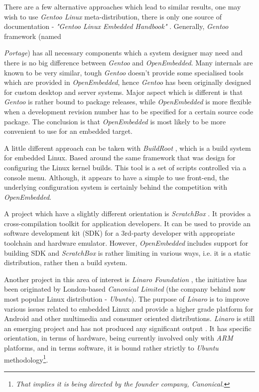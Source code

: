   There are a few alternative approaches which lead to similar results,
 one may wish to use \emph{Gentoo Linux} meta-distribution, there
 is only one source of documentation - \emph{"Gentoo Linux Embedded
 Handbook"} \cite{links:gentoo:embedded}. Generally, \emph{Gentoo}
 framework (named {\emph{Portage}) has all necessary components
 which a system designer may need and there is no big difference
 between \emph{Gentoo} and \emph{OpenEmbedded}. Many internals
 are known to be very similar, tough \emph{Gentoo} doesn't provide
 some specialised tools which are provided in \emph{OpenEmbedded},
 hence \emph{Gentoo} has been originally designed for custom
 desktop and server systems. Major aspect which is different is
 that \emph{Gentoo} is rather bound to package releases, while
 \emph{OpenEmbedded} is more flexible when a development revision
 number has to be specified for a certain source code package.
 The conclusion is that \emph{OpenEmbedded} is most likely to be
 more convenient to use for an embedded target.
 
  A little different approach can be taken with \emph{BuildRoot}
 \cite{links:buildroot:homepage}, which is a build system for
 embedded Linux. Based around the same framework that was design
 for configuring the Linux kernel builds. This tool is a set of
 scripts controlled via a console menu. Although, it appears to
 have a simple to use front-end, the underlying configuration
 system is certainly behind the competition with \emph{OpenEmbedded}.

  A project which have a slightly different orientation is
 \emph{ScratchBox} \cite{links:sbox:homepage}. It provides
 a cross-compilation toolkit for application developers.
 It can be used to provide an software development kit (SDK)
 for a 3rd-party developer with appropriate toolchain and
 hardware emulator. However, \emph{OpenEmbedded} includes
 support for building SDK and \emph{ScratchBox} is rather
 limiting in various ways, i.e. it is a static distribution,
 rather then a build system.
 
  Another project in this area of interest is \emph{Linaro Foundation}
 \cite{links:linaro:homepage}, the initiative has been originated by
 London-based \emph{Canonical Limited} (the company behind now most
 popular Linux distribution - \emph{Ubuntu}).
 The purpose of \emph{Linaro} is to improve various issues related to
 embedded Linux and provide a higher grade platform for Android and
 other multimedia and consumer oriented distributions. \emph{Linaro} is
 still an emerging project and has not produced any significant output
 \cite{links:linaro:homepage}. It has specific orientation, in terms of
 hardware, being currently involved only with \emph{ARM} platforms,
 and in terms software, it is bound rather strictly to \emph{Ubuntu}
 methodology\footnote{\emph{That implies it is being directed by the
 founder company, Canonical.}}.

}
